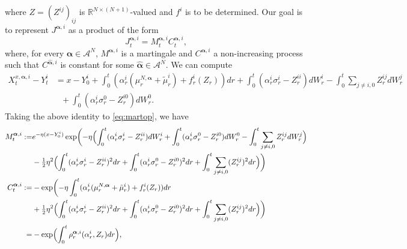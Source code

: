 \documentclass[10pt,a4paper]{article}
\newcommand{\be}{\begin{equation}}
\newcommand{\ee}{\end{equation}}
\newcommand{\Balpha}{\boldsymbol{\alpha}}
\newcommand{\hBalpha}{\hat{\Balpha}}
\theoremstyle{plain}
\theoremstyle{definition}
\numberwithin{equation}{section}
\begin{document}
where $Z = (Z^{ij})_{ij}$ is $\mathbb{R}^{N \times (N+1)}$-valued and $f^{i}$ is to be determined. Our goal is to represent $J^{\Balpha,i}$ as a product of the form
\be\label{eq:martop}
J_{t}^{\Balpha,i} = M_{t}^{\Balpha,i}C_{t}^{\Balpha,i},
\ee
where, for every $\Balpha \in \mathcal{A}^{N}$, $M^{\Balpha,i}$ is a martingale and $C^{\Balpha,i}$ a non-increasing process such that $C^{\hBalpha,i}$ is constant for some $\hat{\Balpha}  \in \mathcal{A}^N$. We can compute
\begin{align*}
X_{t}^{x,\Balpha,i} - Y_{t}^{i}
&= x - Y_{0}^{i} + \int_{0}^{t}(\alpha_{r}^{i}(\mu_{r}^{N,\Balpha}+\tilde{\mu}_{r}^{i})+f_{r}^{i}(Z_{r}))dr + \int_{0}^{t}(\alpha_{r}^{i}\sigma_{r}^{i}-Z_{r}^{ii})dW_{r}^{i}  - \int_{0}^{t}\sum_{j \neq i,0}Z_{r}^{ij}dW_{r}^{j}\\
&\ \ \ + \int_{0}^{t}(\alpha_{r}^{i}\sigma_{r}^{0}-Z_{r}^{i0})dW_{r}^{0}.
\end{align*}
Taking the above identity to \eqref{eq:martop}, we have 
\begin{align}
M_{t}^{\Balpha,i} := & e^{-\eta(x-Y_{0}^{i})}\exp\biggl(-\eta\Bigl(\int_{0}^{t}(\alpha_{r}^{i}\sigma_{r}^{i}-Z_{r}^{ii})dW_{r}^{i} + \int_{0}^{t}(\alpha_{r}^{i}\sigma_{r}^{0}-Z_{r}^{i0})dW_{r}^{0} - \int_{0}^{t}\sum_{j \neq i,0}Z_{r}^{ij}dW_{r}^{j}\Bigr) \nonumber \\
&- \tfrac{1}{2}\eta^{2}\Bigl(\int_{0}^{t}(\alpha_{r}^{i}\sigma_{r}^{i}-Z_{r}^{ii})^{2}dr + \int_{0}^{t}(\alpha_{r}^{i}\sigma_{r}^{0}-Z_{r}^{i0})^{2}dr + \int_{0}^{t}\sum_{j \neq i,0}(Z_{r}^{ij})^{2}dr\Bigr)\biggr) \label{equ:DefM} \\
C_{t}^{\Balpha,i} :=& -\exp\biggl(-\eta\int_{0}^{t}(\alpha_{r}^{i}(\mu_{r}^{N,\Balpha}+\tilde{\mu}_{r}^{i})+f_{r}^{i}(Z_{r}))dr \nonumber \\
&+ \tfrac{1}{2}\eta^{2}\Bigl(\int_{0}^{t}(\alpha_{r}^{i}\sigma_{r}^{i}-Z_{r}^{ii})^{2}dr + \int_{0}^{t}(\alpha_{r}^{i}\sigma_{r}^{0}-Z_{r}^{i0})^{2}dr + \int_{0}^{t}\sum_{j \neq i,0}(Z_{r}^{ij})^{2}dr\Bigr)\biggr) \nonumber \\
 = & -\exp\Bigl(\int_{0}^{t}\rho_{r}^{\Balpha, i}(\alpha_{r}^{i},Z_{r})dr\Bigr), \label{equ:DefC}
\end{align}
\end{document}
